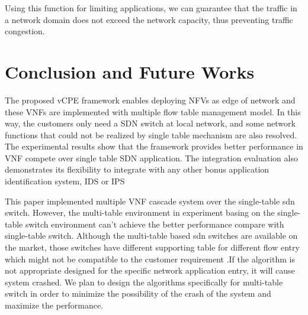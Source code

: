 \documentclass[conference]{IEEEtran}
\begin{document}
Using this function for limiting applications, we can guarantee that the traffic in a network domain does not exceed the network capacity, thus preventing traffic congestion.



\section{Conclusion and Future Works}
The proposed vCPE framework enables deploying NFVs as edge of network and these VNFs are implemented with multiple flow table management model. In this way, the customers only need a SDN switch at local network, and some network functions that could not be realized by single table mechanism are also resolved. The experimental results show that the framework provides better performance in VNF compete over single table SDN application. The integration evaluation also demonstrates its flexibility to integrate with any other bonus application identification system, IDS or IPS

This paper implemented multiple VNF cascade system over the single-table sdn switch. However, the multi-table environment in experiment basing on the single-table switch environment can't achieve the better performance compare with single-table switch. Although the multi-table based sdn switches are available on the market, those switches have different supporting table for different flow entry which might not be compatible to the customer requirement .If the algorithm is not appropriate designed for the specific network application entry, it will cause system crashed. We plan to design the algorithms specifically for multi-table switch in order to minimize the possibility of the crash of the system and maximize the performance.



\end{document}

